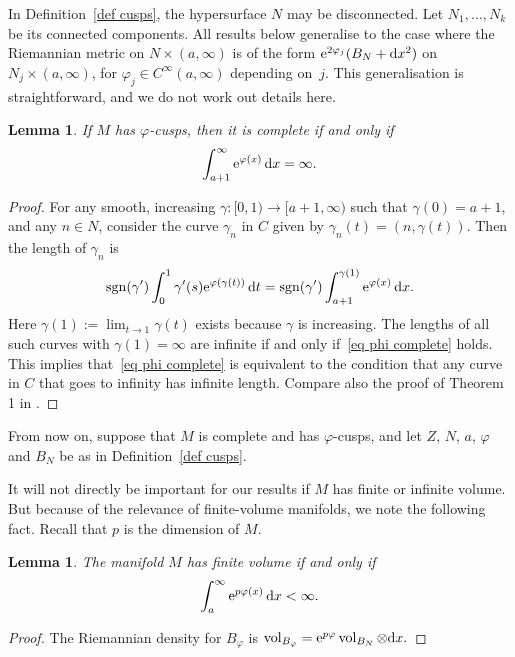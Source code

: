 \documentclass[10pt,a4paper]{amsart}
\numberwithin{equation}{section}
\newtheorem{Lemma}[Theorem]{Lemma}
\DeclareMathOperator{\sgn}{sgn}
\DeclareMathOperator{\vol}{vol}
\begin{document}
\begin{Remark}In Definition~\ref{def cusps}, the hypersurface $N$ may be disconnected. Let $N_1, \dots, N_k$ be its connected components. All results below generalise to the case where the Riemannian metric on $N \times (a,\infty)$ is of the form ${\rm e}^{2\varphi_j}(B_N + {\rm d}x^2)$ on $N_j \times (a, \infty)$, for $\varphi_j \in C^{\infty}(a,\infty)$ depending on~$j$. This generalisation is straightforward, and we do not work out details here.
\end{Remark}

\begin{Lemma}\label{lem phi complete}
If $M$ has $\varphi$-cusps, then it is complete if and only if
\begin{equation} \label{eq phi complete}
\int_{a+1}^{\infty} {\rm e}^{\varphi(x)}\, {\rm d}x = \infty.
\end{equation}
\end{Lemma}
\begin{proof}
For any smooth, increasing $\gamma\colon [0,1) \to [a+1,\infty)$ such that $\gamma(0) = a+1$, and any $n \in N$, consider the curve $\gamma_{n}$ in $C$ given by $\gamma_{n}(t) = (n, \gamma(t))$. Then the length of $\gamma_{n}$ is
\[
\sgn(\gamma') \int_0^1 \gamma'(s) {\rm e}^{\varphi(\gamma(t))}\, {\rm d}t = \sgn(\gamma') \int_{a+1}^{\gamma(1)} {\rm e}^{\varphi(x)}\, {\rm d}x.
\]
Here $\gamma(1):= \lim_{ t\to 1}\gamma(t)$ exists because $\gamma$ is increasing. The lengths of all such curves with $\gamma(1)= \infty$ are infinite if and only if~\eqref{eq phi complete} holds. This implies that~\eqref{eq phi complete} is equivalent to the condition that any curve in $C$ that goes to infinity has infinite length.
Compare also the proof of Theorem 1 in \cite{Nomizu61}.
\end{proof}

From now on, suppose that $M$ is complete and has {$\varphi$-cusps}, and let $Z$, $N$, $a$, $\varphi$ and $B_N$ be as in Definition~\ref{def cusps}.

It will not directly be important for our results if $M$ has finite or infinite volume. But because of the relevance of finite-volume manifolds, we note the following fact. Recall that $p$ is the dimension of $M$.
\begin{Lemma}\label{lem fin vol}
The manifold $M$ has finite volume if and only if
\[
\int_a^{\infty} {\rm e}^{p\varphi(x)}\, {\rm d}x < \infty.
\]
\end{Lemma}
\begin{proof}
The Riemannian density for $B_{\varphi}$ is
$
\vol_{B_{\varphi}} = {\rm e}^{p \varphi} \vol_{B_N} \otimes {\rm d}x.
$
\end{proof}
\end{document}
